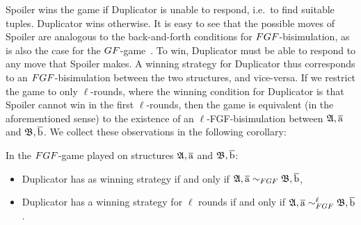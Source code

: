 Spoiler wins the game if Duplicator is unable to respond, i.e.\ to find suitable tuples.
Duplicator wins otherwise.
It is easy to see that the possible moves of Spoiler are analogous to the back-and-forth conditions for $\FGF$-bisimulation, as is also the case for the $\GF$-game~\cite[Sec.\ 3.2]{Gradel014}.
To win, Duplicator must be able to respond to any move that Spoiler makes.
A winning strategy for Duplicator thus corresponds to an $\FGF$-bisimulation between the two structures, and vice-versa.
If we restrict the game to only $\ell$-rounds, where the winning condition for Duplicator is that Spoiler cannot win in the first $\ell$-rounds, then the game is equivalent (in the aforementioned sense) to the existence of an $\ell$-FGF-bisimulation between ${\mathfrak{A}}, \overline{\mathrm{a}}$ and ${\mathfrak{B}}, \overline{\mathrm{b}}$.
We collect these observations in the following corollary:

\begin{corollary}
  In the $\FGF$-game played on structures ${\mathfrak{A}}, \overline{\mathrm{a}}$ and ${\mathfrak{B}}, \overline{\mathrm{b}}$:
  \begin{itemize}
    \item Duplicator has as winning strategy if and only if $\str{A}, \elemtuplea \bisimto_{\FGF} \str{B}, \elemtupleb$,
    \item Duplicator has a winning strategy for $\ell$ rounds if and only if $\str{A}, \elemtuplea \bisimto_{\FGF}^{\ell} \str{B}, \elemtupleb$.
  \end{itemize}
\end{corollary}
